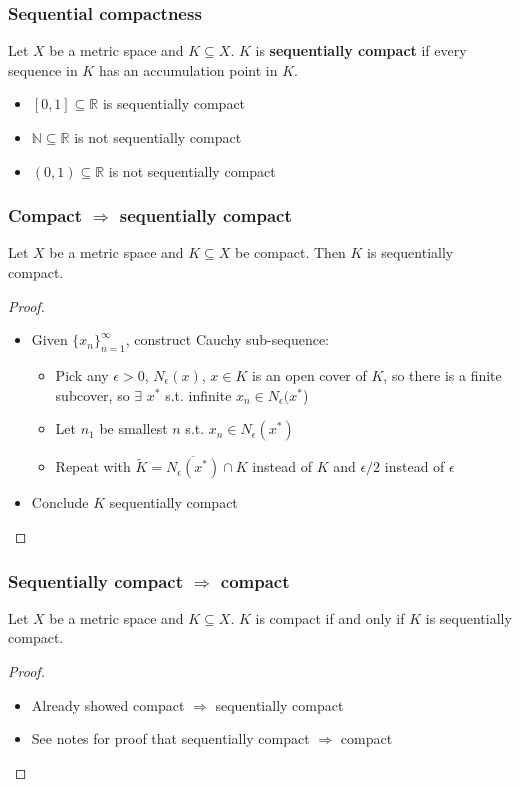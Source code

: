 \documentclass[compress]{beamer}
\def\R{\mathbb{R}}
\newcommand{\seq}[1]{\{{#1}_n \}_{n=1}^\infty }
\begin{document}
\begin{frame}
  \frametitle{Sequential compactness}
  \begin{definition}
    Let $X$ be a metric space and $K \subseteq X$. $K$ is
    \textbf{sequentially compact} if every sequence in $K$ has an
    accumulation point in $K$.
  \end{definition}
  \begin{example}
    \begin{itemize}
    \item $[0,1] \subseteq \R$ is sequentially compact
    \item $\mathbb{N} \subseteq \R$ is not sequentially compact
    \item $(0,1) \subseteq \R$ is not sequentially compact
    \end{itemize}
  \end{example}
\end{frame}

\begin{frame}\frametitle{Compact $\Rightarrow$ sequentially compact}
  \begin{lemma}\label{lem:compactSeqCompact}
    Let $X$ be a metric space and $K \subseteq X$ be compact. Then $K$
    is sequentially compact. 
  \end{lemma}
  \begin{proof}
    \begin{itemize}
    \item Given $\seq{x}$, construct Cauchy sub-sequence:
      \begin{itemize}
      \item  Pick any $\epsilon>0$, $N_\epsilon(x)$, $x \in K$ is an open
        cover of $K$, so there is a finite subcover, so $\exists$
        $x^\ast$ s.t. infinite $x_n \in N_\epsilon(x^\ast$)
      \item Let $n_1$ be smallest $n$ s.t. $x_n \in N_\epsilon(x^\ast)$
      \item Repeat with $\tilde{K} = \overline{N_\epsilon(x^\ast)} \cap
        K$ instead of $K$ and $\epsilon/2$ instead of $\epsilon$
      \end{itemize}
    \item Conclude $K$ sequentially compact
    \end{itemize}
  \end{proof}
\end{frame}

\begin{frame}
  \frametitle{Sequentially compact $\Rightarrow$ compact}
  \begin{theorem}
    Let $X$ be a metric space and $K \subseteq X$. $K$ is compact if and
    only if $K$ is sequentially compact. 
  \end{theorem}
  \begin{proof}
    \begin{itemize}
    \item Already showed compact $\Rightarrow$ sequentially compact
    \item See notes for proof that sequentially compact $\Rightarrow$
      compact 
    \end{itemize}
  \end{proof}
\end{frame}
\end{document}
